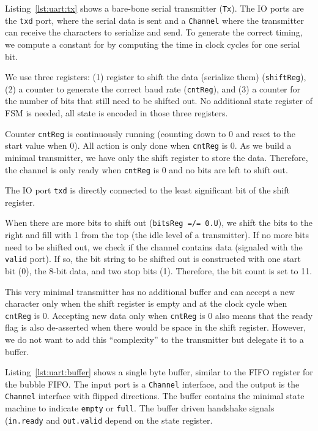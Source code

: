 \documentclass[%
    10pt,
    headinclude, footexclude,
    openright, %
    notitlepage,
    cleardoubleempty,
    headsepline,
    pointlessnumbers,
    bibtotoc, idxtotoc,
    ]{scrbook}
\newcommand{\code}[1]{{\small{\texttt{#1}}}}
\begin{document}
{

Listing~\ref{lst:uart:tx} shows a bare-bone serial transmitter (\code{Tx}).
The IO ports are the \code{txd} port, where the serial data is sent and
a \code{Channel} where the transmitter can receive the characters to serialize
and send.
To generate the correct timing, we compute a constant for by computing
the time in clock cycles for one serial bit.

We use three registers:
(1) register to shift the data (serialize them) (\code{shiftReg}),
(2) a counter to generate the correct baud rate (\code{cntReg}), and
(3) a counter for the number of bits that still need to be shifted out.
No additional state register of FSM is needed, all state is encoded in
those three registers.

Counter \code{cntReg} is continuously running (counting down to 0
and reset to the start value when 0). All action is only done when
\code{cntReg} is 0. As we build a minimal transmitter, we have only
the shift register to store the data. Therefore, the channel is only ready
when \code{cntReg} is 0 and no bits are left to shift out.

The IO port \code{txd} is directly connected to the least significant bit
of the shift register.

When there are more bits to shift out (\code{bitsReg =/= 0.U}),
we shift the bits to the right and fill with 1 from the top (the idle level
of a transmitter).
If no more bits need to be shifted out, we check if the channel contains
data (signaled with the \code{valid} port). If so, the bit string to
be shifted out is constructed with one start bit (0), the 8-bit data, and
two stop bits (1). Therefore, the bit count is set to 11.

This very minimal transmitter has no additional buffer and can
accept a new character only when the shift register is empty
and at the clock cycle when \code{cntReg} is 0.
Accepting new data only when \code{cntReg} is 0 also means
that the ready flag is also de-asserted when there would be
space in the shift register. However, we do not want to add this
``complexity'' to the transmitter but delegate it to a buffer.

Listing~\ref{lst:uart:buffer} shows a single byte buffer, similar to
the FIFO register for the bubble FIFO. The input port is a \code{Channel}
interface, and the output is the \code{Channel} interface with
flipped directions. The buffer contains the minimal state machine
to indicate \code{empty} or \code{full}. The buffer driven handshake
signals (\code{in.ready} and \code{out.valid} depend on the state
register.

}
\end{document}
